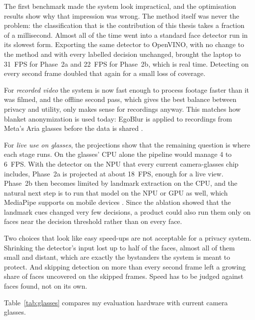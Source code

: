 The first benchmark made the system look impractical, and the optimisation results show
why that impression was wrong. The method itself was never the problem: the classification
that is the contribution of this thesis takes a fraction of a millisecond. Almost all of
the time went into a standard face detector run in its slowest form. Exporting the same
detector to OpenVINO, with no change to the method and with every labelled decision
unchanged, brought the laptop to 31~FPS for Phase~2a and 22~FPS for Phase~2b, which is real time.
Detecting on every second frame doubled that again for a small loss of coverage.

For \emph{recorded video} the system is now fast enough to process footage faster than it
was filmed, and the offline second pass, which gives the best balance between privacy and
utility, only makes sense for recordings anyway. This matches how blanket anonymization is
used today: EgoBlur is applied to recordings from Meta's Aria glasses before the data is
shared \cite{egoblur2023}.

For \emph{live use on glasses}, the projections show that the remaining question is where
each stage runs. On the glasses' CPU alone the pipeline would manage 4 to 6~FPS. With the
detector on the NPU that every current camera-glasses chip includes, Phase~2a is projected
at about 18~FPS, enough for a live view. Phase~2b then becomes limited by landmark
extraction on the CPU, and the natural next step is to run that model on the NPU or GPU as
well, which MediaPipe supports on mobile devices \cite{lugaresi2019mediapipe}. Since the
ablation showed that the landmark cues changed very few decisions, a product could also
run them only on faces near the decision threshold rather than on every face.

Two choices that look like easy speed-ups are not acceptable for a privacy system.
Shrinking the detector's input lost up to half of the faces, almost all of them small and
distant, which are exactly the bystanders the system is meant to protect. And skipping
detection on more than every second frame left a growing share of faces uncovered on the
skipped frames. Speed has to be judged against faces found, not on its own.

Table~\ref{tab:glasses} compares my evaluation hardware with current camera glasses.

